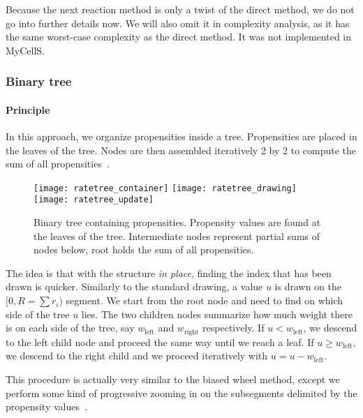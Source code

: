Because the next reaction method is only a twist of the direct method,
we do not go into further details now.
We will also omit it in complexity analysis, as it has the same worst-case complexity as the direct method.
It was not implemented in MyCellS.


\subsubsection{Binary tree}

\paragraph{Principle}
In this approach, we organize propensities inside a tree.
Propensities are placed in the leaves of the tree.
Nodes are then assembled iteratively 2 by 2 to compute the sum of all propensities~.

\begin{figure}[!h]
  \centering
  \begin{minipage}{0.8\textwidth}
    \texttt{[image: ratetree\_container]}
    \texttt{[image: ratetree\_drawing]}
    \texttt{[image: ratetree\_update]}
  \end{minipage}
  \caption{Binary tree containing propensities.
  Propensity values are found at the leaves of the tree.
  Intermediate nodes represent partial sums of nodes below,
  root holds the sum of all propensities.}
\label{fig:binary_tree}
\end{figure}

The idea is that with the structure \emph{in place}, finding the index that has been drawn is quicker.
Similarly to the standard drawing, a value $u$ is drawn on the $[0, R=\sum r_i)$ segment.
We start from the root node and need to find on which side of the tree $u$ lies.
The two children nodes summarize how much weight there is on each side of the tree,
say $w_\textrm{left}$ and $w_\textrm{right}$ respectively.
If $u < w_\textrm{left}$, we descend to the left child node and proceed the same way until we reach a leaf.
If $u \geq w_\textrm{left}$, we descend to the right child and we proceed iteratively with $u = u - w_\textrm{left}$.

This procedure is actually very similar to the biased wheel method,
except we perform some kind of progressive zooming in on the subsegments delimited by the propensity values~.

